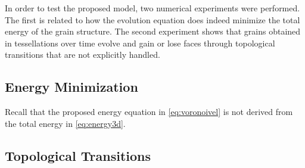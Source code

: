 In order to test the proposed model, two numerical experiments were performed. The first is related to how the evolution equation does indeed minimize the total energy of the grain structure. The second experiment shows that grains obtained in tessellations over time evolve and gain or lose faces through topological transitions that are not explicitly handled.

\subsection{Energy Minimization}

Recall that the proposed energy equation in \eqref{eq:voronoivel} is not derived from the total energy in \eqref{eq:energy3d}.

\subsection{Topological Transitions}